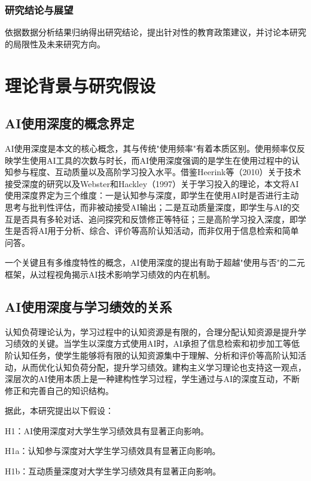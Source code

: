 \documentclass{njtech-thesis}
\begin{document}
\subsubsection{研究结论与展望}

依据数据分析结果归纳得出研究结论，提出针对性的教育政策建议，并讨论本研究的局限性及未来研究方向。

\section{理论背景与研究假设}

\subsection{AI使用深度的概念界定}

AI使用深度是本文的核心概念，其与传统"使用频率"有着本质区别。使用频率仅反映学生使用AI工具的次数与时长，而AI使用深度强调的是学生在使用过程中的认知参与程度、互动质量以及高阶学习投入水平。借鉴Heerink等（2010）关于技术接受深度的研究以及Webster和Hackley（1997）关于学习投入的理论，本文将AI使用深度界定为三个维度：一是认知参与深度，即学生在使用AI时是否进行主动思考与批判性评估，而非被动接受AI输出；二是互动质量深度，即学生与AI的交互是否具有多轮对话、追问探究和反馈修正等特征；三是高阶学习投入深度，即学生是否将AI用于分析、综合、评价等高阶认知活动，而非仅用于信息检索和简单问答。

一个关键且有多维度特性的概念，AI使用深度的提出有助于超越"使用与否"的二元框架，从过程视角揭示AI技术影响学习绩效的内在机制。

\subsection{AI使用深度与学习绩效的关系}

认知负荷理论认为，学习过程中的认知资源是有限的，合理分配认知资源是提升学习绩效的关键。当学生以深度方式使用AI时，AI承担了信息检索和初步加工等低阶认知任务，使学生能够将有限的认知资源集中于理解、分析和评价等高阶认知活动，从而优化认知负荷分配，提升学习绩效。建构主义学习理论也支持这一观点，深层次的AI使用本质上是一种建构性学习过程，学生通过与AI的深度互动，不断修正和完善自己的知识结构。

据此，本研究提出以下假设：

H1：AI使用深度对大学生学习绩效具有显著正向影响。

H1a：认知参与深度对大学生学习绩效具有显著正向影响。

H1b：互动质量深度对大学生学习绩效具有显著正向影响。
\end{document}
